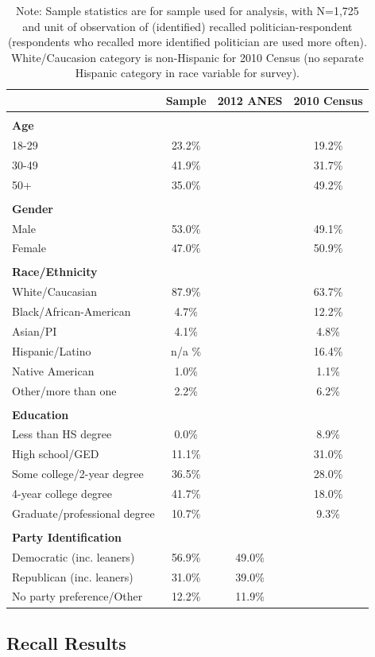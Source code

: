\documentclass[12pt, letterpaper]{article}
\begin{document}
\begin{table}[ht]
\small
\caption{Sample Demographics Compared to Benchmarks}
\centering
\label{si_survey_dem}
\begin{tabular}{l c c c}
\hline
& Sample & 2012 ANES & 2010 Census\\
\hline
& & &\\
\textbf{Age} & & &\\
18-29 & 23.2\% & & 19.2\%\\
30-49 & 41.9\% & & 31.7\%\\
50+ & 35.0\% & & 49.2\%\\
& & &\\
\textbf{Gender} & & &\\
Male & 53.0\% & & 49.1\%\\
Female & 47.0\% & & 50.9\%\\
& & &\\
\textbf{Race/Ethnicity} & & &\\
White/Caucasian & 87.9\% & & 63.7\% \\
Black/African-American & 4.7\% & & 12.2\%\\
Asian/PI & 4.1\% & & 4.8\%\\
Hispanic/Latino & n/a \% & & 16.4\%\\
Native American & 1.0\% & & 1.1\%\\
Other/more than one & 2.2\% & & 6.2\%\\
& & &\\
\textbf{Education} & & &\\
Less than HS degree & 0.0\% & & 8.9\%\\
High school/GED & 11.1\% & & 31.0\%\\
Some college/2-year degree & 36.5\% & &28.0\%\\
4-year college degree & 41.7\% & & 18.0\%\\
Graduate/professional degree & 10.7\% & & 9.3\%\\
& & &\\
\textbf{Party Identification} & & &\\
Democratic (inc. leaners) & 56.9\% & 49.0\% &\\
Republican (inc. leaners) & 31.0\% & 39.0\% &\\
No party preference/Other & 12.2\% & 11.9\% &\\
\hline
\end{tabular}
\caption*{Note: Sample statistics are for sample used for analysis, with N=1,725 and unit of observation of (identified) recalled politician-respondent (respondents who recalled more identified politician are used more often).  White/Caucasion category is non-Hispanic for 2010 Census (no separate Hispanic category in race variable for survey).}
\end{table}
\clearpage

\subsection{Recall Results}
\label{si_recall}

\end{document}

